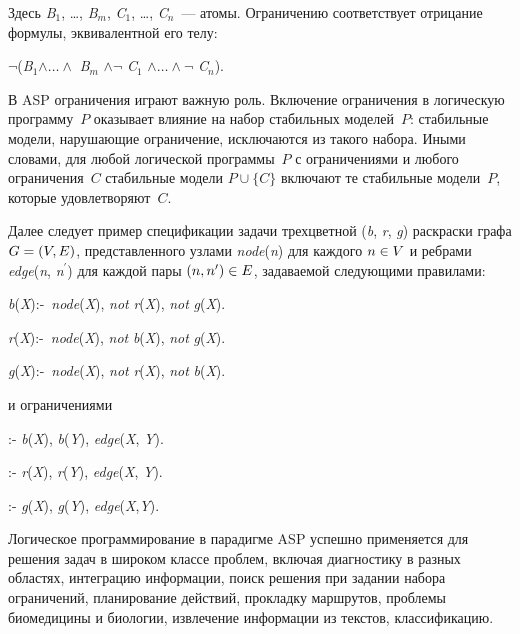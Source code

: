 \begin{multicols}{2}
\noindent
Здесь \textit{B}$_1$, \ldots , \textit{B}$_m$, \textit{C}$_1$, \ldots , \textit{C}$_n$~--- 
атомы. Ограничению соответствует отрицание 
формулы, эквивалентной его телу:

\begin{center}
$\lnot$\;(\textit{B}$_1$\;$\land \ldots \land$ 
\textit{B}$_m$ $\land \lnot$ \textit{C}$_1$ $\land \ldots \land \lnot$ \textit{C}$_n$).
\end{center}

\noindent
В ASP ограничения играют важную роль. Включение ограничения в логическую 
программу~$P$ оказывает влияние на набор стабильных моделей~$P$: стабильные модели, 
нарушающие ограничение, исключаются из такого набора. Иными словами, для любой 
логической программы~$P$ с ограничениями и любого ограничения~$C$ стабильные 
модели $P\cup \{C\}$ включают те стабильные модели~$P$, которые удовле\-тво\-ря\-ют~$C$.

Далее следует пример спецификации задачи трехцветной (\textit{b}, \textit{r}, \textit{g}) 
раскраски графа $G \hm= 
(V, E)$, представленного узлами \textit{node}(\textit{n}) для каждого 
$n \hm\in V$ и ребрами \textit{edge}(\textit{n}, \textit{n}$^\prime$) 
для каждой пары $(n, n^\prime) \hm\in E$, задаваемой следующими правилами:

\smallskip

\textit{b}(\textit{X}):\;-\ \textit{node}(\textit{X}), 
\textit{not}\; \textit{r}(\textit{X}), \textit{not}\; \textit{g}(\textit{X}). 

\textit{r}(\textit{X}):\;-\ 
\textit{node}(\textit{X}), \textit{not}\; \textit{b}(\textit{X}), \textit{not} \textit{g}(\textit{X}).

\textit{g}(\textit{X}):\;-\ 
\textit{node}(\textit{X}), \textit{not}\; \textit{r}(\textit{X}), \textit{not} \textit{b}(\textit{X}).

\smallskip

\noindent
и ограничениями

\smallskip

:\;- \textit{b}(\textit{X}), \textit{b}(\textit{Y}), \textit{edge}(\textit{X}, \textit{Y}).

:\;- \textit{r}(\textit{X}), \textit{r}(\textit{Y}), \textit{edge}(\textit{X}, \textit{Y}).

:\;- \textit{g}(\textit{X}), \textit{g}(\textit{Y}), \textit{edge}(\textit{X},\textit{Y}).

\smallskip

Логическое программирование в парадигме ASP успешно применяется для решения задач в 
широком классе проблем, включая диагностику в разных областях, интеграцию 
информации, поиск решения при задании набора ограничений, планирование действий, 
прокладку маршрутов, проблемы биомедицины и биологии, извлечение информации из 
текстов, классификацию.


\end{multicols}
